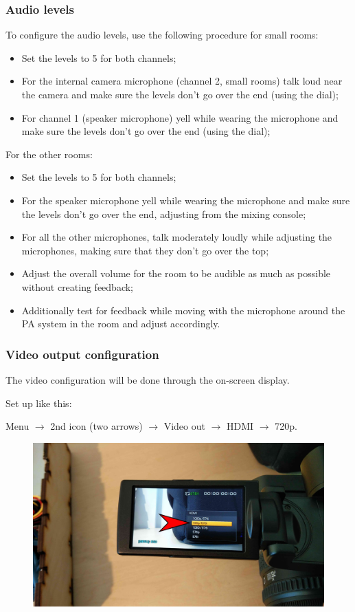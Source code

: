 \documentclass{article}
\begin{document}
\subsubsection{Audio levels}

To configure the audio levels, use the following procedure for small rooms:
\begin{itemize}
  \item Set the levels to 5 for both channels;
  \item For the internal camera microphone (channel 2, small rooms) talk loud near the camera and make sure the levels don't go over the end (using the dial);
  \item For channel 1 (speaker microphone) yell while wearing the microphone and make sure the levels don't go over the end (using the dial);
\end{itemize}

For the other rooms:

\begin{itemize}
  \item Set the levels to 5 for both channels;
  \item For the speaker microphone yell while wearing the microphone and make sure the levels don't go over the end, adjusting from the mixing console;
  \item For all the other microphones, talk moderately loudly while adjusting the microphones, making sure that they don't go over the top;
  \item Adjust the overall volume for the room to be audible as much as possible without creating feedback;
  \item Additionally test for feedback while moving with the microphone around the PA system in the room and adjust accordingly.
\end{itemize}

\subsubsection{Video output configuration}
The video configuration will be done through the on-screen display.

Set up like this:

Menu $\rightarrow$ 2nd icon (two arrows) $\rightarrow$ Video out $\rightarrow$ HDMI $\rightarrow$ 720p.
\begin{figure}[H]
  \centering
\includegraphics[width = 120mm]{Sony05.jpg}
\end{figure}
\end{document}
